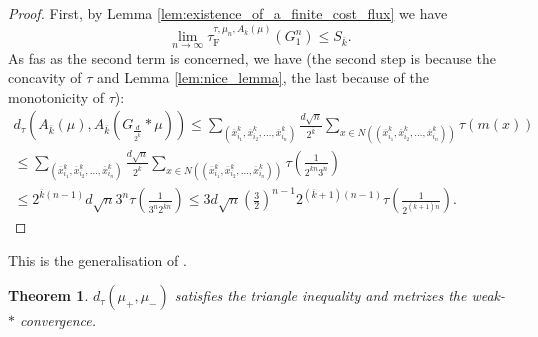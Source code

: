 \documentclass[10pt,a4paper,oneside,final]{article}
\newcommand{\JEnXia}[1][\tau]{#1_{\mathrm{F}}}%
\newcommand{\dtau}{d_\tau}
\numberwithin{equation}{section}
\theoremstyle{plain}
\newtheorem{theorem}{Theorem}[section]
\theoremstyle{definition}
\theoremstyle{remark}
\begin{document}
{\begin{proof}
First, by Lemma \ref{lem:existence_of_a_finite_cost_flux} we have
\begin{displaymath}
 \lim_{n \to \infty} \JEnXia^{\tau,\mu_n,A_{\overline{k}}(\mu)}(G_1^n) \leq S_{\overline{k}}.
\end{displaymath}
As fas as the second term is concerned, we have (the second step is because the concavity of $\tau$ and Lemma \ref{lem:nice_lemma}, the last because of the monotonicity of $\tau$):
\begin{multline*}
 \dtau(A_{\overline{k}}(\mu),A_{\overline{k}}(G_{\frac{d}{2^{\overline{k}}}}\ast\mu)) \leq \sum_{(\overline{x}_{i_1}^k,\overline{x}_{i_2}^k,\ldots,\overline{x}_{i_n}^k)} \frac{d\sqrt{n}}{2^{\overline{k}}} \sum_{x \in N((\overline{x}_{i_1}^k,\overline{x}_{i_2}^k,\ldots,\overline{x}_{i_n}^k))}\tau(m(x))\\
%
 \leq \sum_{(\overline{x}_{i_1}^k,\overline{x}_{i_2}^k,\ldots,\overline{x}_{i_n}^k)} \frac{d\sqrt{n}}{2^{\overline{k}}} \sum_{x \in N((\overline{x}_{i_1}^k,\overline{x}_{i_2}^k,\ldots,\overline{x}_{i_n}^k))} \tau(\frac{1}{2^{\overline{k}n}3^n})\\
%
 \leq 2^{\overline{k}(n-1)}d\sqrt{n}3^n\tau(\frac{1}{3^n2^{\overline{k}n}}) \leq 3d\sqrt{n}\left(\frac{3}{2}\right)^{n-1} 2^{(\overline{k}+1)(n-1)}\tau(\frac{1}{2^{(\overline{k}+1)n}}).
\end{multline*}
\end{proof}

This is the generalisation of \cite[Theorem 4.2]{Xia-Optimal-Paths}.

\begin{theorem}\label{thm:d_tau_and_the_weak_convergence}
$\dtau(\mu_+,\mu_-)$ satisfies the triangle inequality and metrizes the weak-$*$ convergence.
\end{theorem}

}
\end{document}
